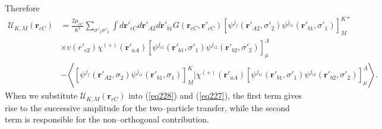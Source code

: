 Therefore
\begin{equation}\label{eq233}
 \begin{split}
\mathcal U_{K,M}(\mathbf{r}_{cC})&=\frac{2\mu_{cC}}{\hbar^2}\sum_{\sigma'_1 \sigma'_2} \int d\mathbf{r}'_{cC}d\mathbf{r}'_{A2}d\mathbf{r}'_{b1}G(\mathbf{r}_{cC},\mathbf{r}'_{cC}) \left[ \psi^{j_f} (\mathbf{r}'_{A2}, \sigma'_2) \psi^{j_{i1}} (\mathbf{r}'_{b1}, \sigma'_1) \right] _{M}^{K*}\\
&\times v(r'_{c2}) \chi^{(+)}(\mathbf{r}'_{aA})\left[ \psi^{j_{i1}} (\mathbf{r}'_{b1}, \sigma'_1) \psi^{j_{i2}} (\mathbf{r}'_{b2}, \sigma'_2) \right]_{\mu}^{\Lambda}\\
&-\left \langle \left[ \psi^{j_f} (\mathbf{r}'_{A2}, \sigma_2) \psi^{j_{i1}} (\mathbf{r}'_{b1}, \sigma_1) \right] _{M}^{K} \Big | \chi^{(+)}(\mathbf{r}'_{aA})\left[ \psi^{j_{i1}} (\mathbf{r}'_{b1}, \sigma'_1) \psi^{j_{i2}} (\mathbf{r}'_{b2}, \sigma'_2) \right]_{\mu}^{\Lambda} \right \rangle.
\end{split}
\end{equation}
When we substitute $\mathcal U_{K,M}(\mathbf{r}_{cC})$ into (\ref{eq228}) and (\ref{eq227}), the first term gives rise to the successive amplitude for the two--particle transfer, while the second term is responsible for the non--orthogonal contribution.
